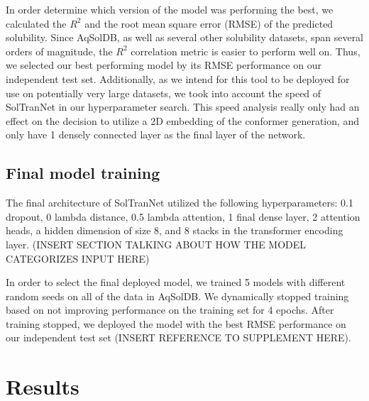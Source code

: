 \documentclass[journal=jmcmar,manuscript=article]{achemso}
\begin{document}
In order determine which version of the model was performing the best, we calculated the $R^2$ and the root mean square error (RMSE) of the predicted solubility.
Since AqSolDB, as well as several other solubility datasets, span several orders of magnitude, the $R^2$ correlation metric is easier to perform well on.
Thus, we selected our best performing model by its RMSE performance on our independent test set.
Additionally, as we intend for this tool to be deployed for use on potentially very large datasets, we took into account the speed of SolTranNet in our hyperparameter search.
This speed analysis really only had an effect on the decision to utilize a 2D embedding of the conformer generation, and only have 1 densely connected layer as the final layer of the network.

\subsection{Final model training}
The final architecture of SolTranNet utilized the following hyperparameters: 0.1 dropout, 0 lambda distance, 0.5 lambda attention, 1 final dense layer, 2 attention heads, a hidden dimension of size 8, and 8 stacks in the transformer encoding layer.
(INSERT SECTION TALKING ABOUT HOW THE MODEL CATEGORIZES INPUT HERE)

In order to select the final deployed model, we trained 5 models with different random seeds on all of the data in AqSolDB.
We dynamically stopped training based on not improving performance on the training set for 4 epochs.
After training stopped, we deployed the model with the best RMSE performance on our independent test set (INSERT REFERENCE TO SUPPLEMENT HERE).

\section{Results}
\end{document}

